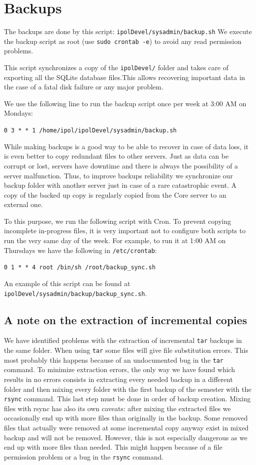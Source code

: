 \documentclass[a4paper,12pt]{article}
\begin{document}

\section{Backups}
\label{sec:backups}
The backups are done by this script: {\tt ipolDevel/sysadmin/backup.sh}
We execute the backup script as root (use {\tt sudo crontab -e}) to avoid any read permission problems.

This script synchronizes a copy of the {\tt ipolDevel/} folder and takes care of exporting all the SQLite database files.This allows recovering important data in the case of a fatal disk failure or any major problem.

We use the following line to run the backup script once per week at 3:00 AM on Mondays:

{\tt 0 3 * * 1 /home/ipol/ipolDevel/sysadmin/backup.sh}

While making backups is a good way to be able to recover in case of data loss, it is even better to copy redundant files to other servers. Just as data can be corrupt or lost, servers have downtime and there is always the possibility of a server malfunction. Thus, to improve backups reliability we synchronize our backup folder with another server just in case of a rare catastrophic event. A copy of the backed up copy is regularly copied from the Core server to an external one.

To this purpose, we run the following script with Cron. To prevent copying incomplete in-progress files, it is very important not to configure both scripts to run the very same day of the week. For example, to run it at 1:00 AM on Thursdays we have the following in {\tt /etc/crontab}:

{\tt 0 1   * * 4   root     /bin/sh /root/backup\_sync.sh}

An example of this script can be found at {\tt ipolDevel/sysadmin/backup/backup\_sync.sh}.

\subsection{A note on the extraction of incremental copies}
We have identified problems with the extraction of incremental {\tt tar} backups in the same folder. When using {\tt tar} some files will give file substitution errors. This most probably this happens because of an undocumented bug in the {\tt tar} command. To minimize extraction errors, the only way we have found which results in no errors consists in extracting every needed backup in a different folder and then mixing every folder with the first backup of the semester with the {\tt rsync} command. This last step must be done in order of backup creation. Mixing files with rsync has also its own caveats: after mixing the extracted files we occasionally end up with more files than originally in the backup. Some removed files that actually were removed at some incremental copy anyway exist in mixed backup and will not be removed. However, this is not especially dangerous as we end up with more files than needed. This might happen because of a file permission problem or a bug in the {\tt rsync} command.
\end{document}
